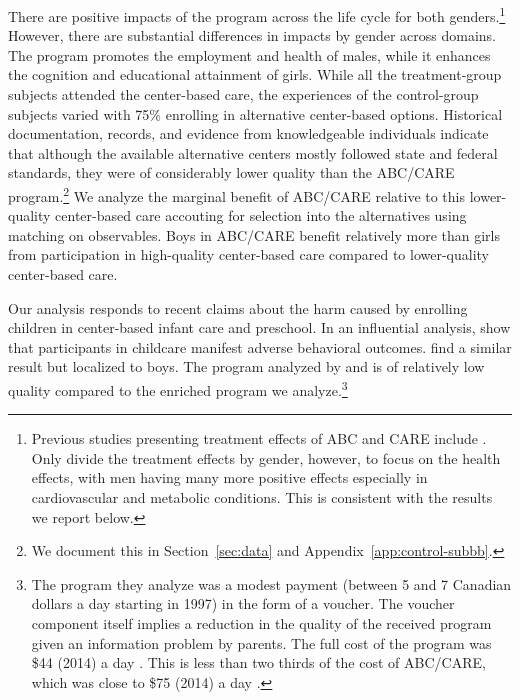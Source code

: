 There are positive impacts of the program across the life cycle for both genders.\footnote{Previous studies presenting treatment effects of ABC and CARE include \citet{Ramey_etal_1985_Project-CARE_TiECSE,Clarke_Campbell_1998_ABC_Comparison_ECRQ,Campbell_Pungello_etal_2001_DP,Campbell_Ramey_etal_2002_ADS,Campbell_Wasik_etal_2008_ECRQ,Campbell_Conti_etal_2014_EarlyChildhoodInvestments}. Only \citet{Campbell_Conti_etal_2014_EarlyChildhoodInvestments} divide the treatment effects by gender, however, to focus on the health effects, with men having many more positive effects especially in cardiovascular and metabolic conditions. This is consistent with the results we report below.} However, there are substantial differences in impacts by gender across domains. The program promotes the employment and health of males, while it enhances the cognition and educational attainment of girls. While all the treatment-group subjects attended the center-based care, the experiences of the control-group subjects varied with 75\% enrolling in alternative center-based options. Historical documentation, records, and evidence from knowledgeable individuals indicate that although the available alternative centers mostly followed state and federal standards, they were of considerably lower quality than the ABC/CARE program.\footnote{We document this in Section~\ref{sec:data} and Appendix~\ref{app:control-subbb}.} We analyze the marginal benefit of ABC/CARE relative to this lower-quality center-based care accouting for selection into the alternatives using matching on observables. Boys in ABC/CARE benefit relatively more than girls from participation in high-quality center-based care compared to lower-quality center-based care.

Our analysis responds to recent claims about the harm caused by enrolling children in center-based infant care and preschool. In an influential analysis, \citet{Baker_Gruber_etal_2008_JPE} show that participants in childcare manifest adverse behavioral outcomes. \citet{Kottelenberg_Lehrer_2014_Gender-Effects} find a similar result but localized to boys.  The program analyzed by \citet{Baker_Gruber_Milligan_2015_Noncog_Defects} and \citet{Kottelenberg_Lehrer_2014_Gender-Effects} is of relatively low quality compared to the enriched program we analyze.\footnote{The program they analyze was a modest payment (between 5 and 7 Canadian dollars a day starting in 1997) in the form of a voucher. The voucher component itself implies a reduction in the quality of the received program given an information problem by parents. The full cost of the program was \$44 (2014) a day \citep{Baker_etal_2005_Universal_Childcare_NBER}. This is less than two thirds of the cost of ABC/CARE, which was close to \$75 (2014) a day \citep{Garcia_Heckman_Leaf_etal_2017_Comp_CBA_Unpublished}.}  

